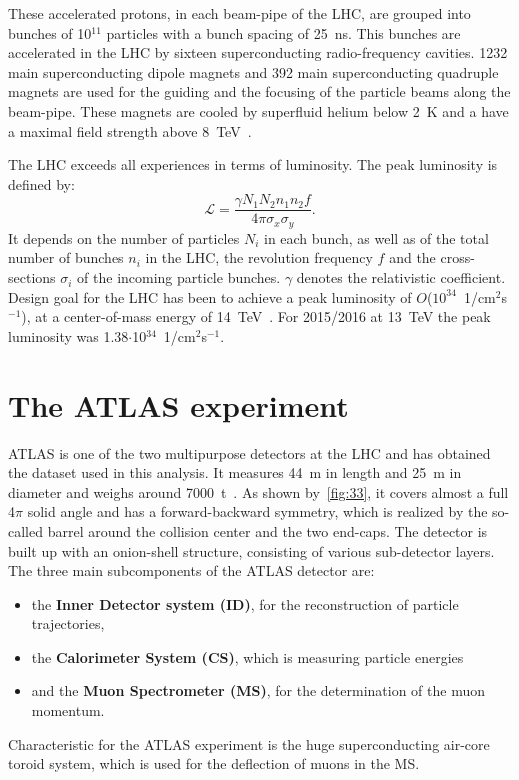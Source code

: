  These accelerated protons, in each beam-pipe of the LHC, are grouped into bunches of 10$^{11}$ particles with a bunch spacing of 25~ns. This bunches are accelerated in the LHC by sixteen superconducting radio-frequency cavities. 1232 main superconducting dipole magnets and 392 main superconducting quadruple magnets are used for the guiding and the focusing of the particle beams along the beam-pipe. These magnets are cooled by superfluid helium below 2~K and a have a maximal field strength above 8~TeV~\cite{Evans:2008zzb}.   


 The LHC  exceeds all experiences in terms of luminosity. The peak luminosity is defined by:
\begin{equation}
\mathscr{L} = \frac{\gamma N_1N_2n_1n_2f}{4\pi \sigma_x \sigma_y }.
\end{equation}
 It depends on the number of particles $N_i$ in each bunch, as well as of the total number of bunches $n_i$ in the LHC, the revolution frequency $f$ and the cross-sections $\sigma_i$ of the incoming particle bunches. $\gamma$ denotes the relativistic coefficient. Design goal for the LHC has been to achieve a peak luminosity of $O$($10^{34}$~1/cm$^2$s$^{-1}$), at a center-of-mass energy of 14~TeV~\cite{Bruning:2004ej}. For 2015/2016 at 13~TeV the peak luminosity was 1.38$\cdot$10$^{34}$~1/cm$^2$s$^{-1}$.  
 
 
\section{The ATLAS experiment}\label{ATLAS}
 ATLAS  is one of the two multipurpose detectors at the LHC and has obtained the dataset used in this analysis. It measures 44~m in length and 25~m in diameter and weighs around 7000~t~\cite{Aad:2008zzm}. 
 As shown by~\cref{fig:33}, it covers almost a full 4$\pi$ solid angle and has a forward-backward symmetry, which is realized by the so-called barrel around the collision center and the two end-caps. The detector is built up with an onion-shell structure, consisting of various sub-detector layers. The three main subcomponents of the ATLAS detector are:
 \begin{itemize}
 	\item the \textbf{Inner Detector system (ID)}, for the reconstruction of particle trajectories, 
 	\item  the \textbf{Calorimeter System (CS)}, which is measuring particle energies
 	\item  and the \textbf{Muon Spectrometer (MS)}, for the determination of the muon momentum.
 \end{itemize} 
Characteristic for the ATLAS experiment is the huge superconducting air-core toroid system, which is used for the deflection of muons in the MS. 

